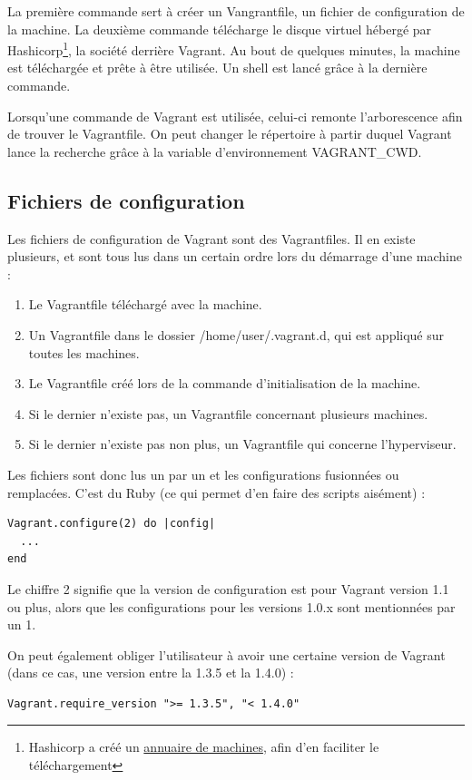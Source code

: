 \documentclass[12pt,a4paper]{article}
\begin{document}
La première commande sert à créer un Vangrantfile, un fichier de configuration de la machine. La deuxième commande télécharge le disque virtuel hébergé par Hashicorp\footnote{Hashicorp a créé un \href{https://atlas.hashicorp.com/boxes/search}{annuaire de machines}, afin d'en faciliter le téléchargement}, la société derrière Vagrant.
Au bout de quelques minutes, la machine est téléchargée et prête à être utilisée. Un shell est lancé grâce à la dernière commande. 

Lorsqu'une commande de Vagrant est utilisée, celui-ci remonte l'arborescence afin de trouver le Vagrantfile. On peut changer le répertoire à partir duquel Vagrant lance la recherche grâce à la variable d'environnement VAGRANT\_CWD. 

\subsection{Fichiers de configuration}
Les fichiers de configuration de Vagrant sont des Vagrantfiles. Il en existe plusieurs, et sont tous lus dans un certain ordre lors du démarrage d'une machine :
\begin{enumerate}
	\item{Le Vagrantfile téléchargé avec la machine.}
	\item{Un Vagrantfile dans le dossier /home/user/.vagrant.d, qui est appliqué sur toutes les machines.}
	\item{Le Vagrantfile créé lors de la commande d'initialisation de la machine.}
	\item{Si le dernier n'existe pas, un Vagrantfile concernant plusieurs machines.}
	\item{Si le dernier n'existe pas non plus, un Vagrantfile qui concerne l'hyperviseur.}
\end{enumerate}

Les fichiers sont donc lus un par un et les configurations fusionnées ou remplacées. C'est du Ruby (ce qui permet d'en faire des scripts aisément) :
\begin{lstlisting}
Vagrant.configure(2) do |config|
  ...
end
\end{lstlisting}
Le chiffre 2 signifie que la version de configuration est pour Vagrant version 1.1 ou plus, alors que les configurations pour les versions 1.0.x sont mentionnées par un 1.

On peut également obliger l'utilisateur à avoir une certaine version de Vagrant (dans ce cas, une version entre la 1.3.5 et la 1.4.0) :
\begin{lstlisting}
Vagrant.require_version ">= 1.3.5", "< 1.4.0"
\end{lstlisting}
\end{document}
